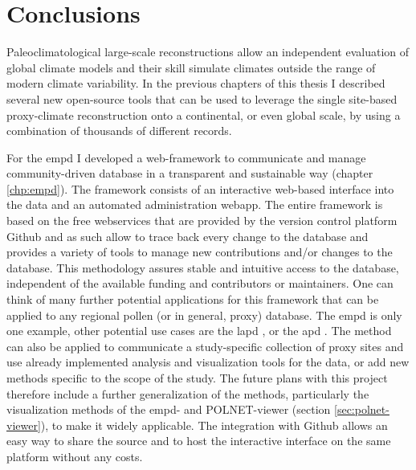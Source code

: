 
\chapter{Conclusions} 

\label{chp:conclusions}

\begin{refsection}

Paleoclimatological large-scale reconstructions allow an independent evaluation of global climate models and their skill simulate climates outside the range of modern climate variability. In the previous chapters of this thesis I described several new open-source tools that can be used to leverage the single site-based proxy-climate reconstruction onto a continental, or even global scale, by using a combination of thousands of different records. 

For the \gls{empd} \citep{DavisChevalierSommerEtAlinprep} I developed a web-framework to communicate and manage community-driven database in a transparent and sustainable way (chapter \ref{chp:empd}). The framework consists of an interactive web-based interface into the data and an automated administration webapp. The entire framework is based on the free webservices that are provided by the version control platform Github and as such allow to trace back every change to the database and provides a variety of tools to manage new contributions and/or changes to the database. This methodology assures stable and intuitive access to the database, independent of the available funding and contributors or maintainers. One can think of many further potential applications for this framework that can be applied to any regional pollen (or in general, proxy) database. The \gls{empd} is only one example, other potential use cases are the \gls{lapd} \citep{FlantuaHooghiemstraGrimmEtAl2015}, or the \gls{apd} \citep{VincensLezineBuchetEtAl2007}. The method can also be applied to communicate a study-specific collection of proxy sites and use already implemented analysis and visualization tools for the data, or add new methods specific to the scope of the study. The future plans with this project therefore include a further generalization of the methods, particularly the visualization methods of the \gls{empd}- and POLNET-viewer (section \ref{sec:polnet-viewer}), to make it widely applicable. The integration with Github allows an easy way to share the source and to host the interactive interface on the same platform without any costs.


\end{refsection}

